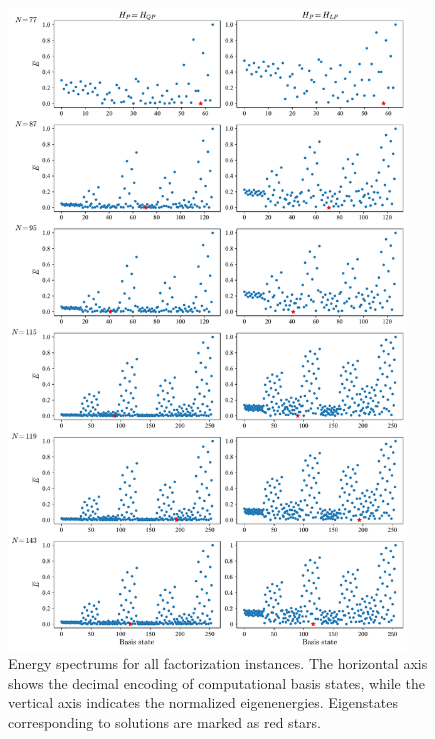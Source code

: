 \begin{figure}[H]
    \centering
    \includegraphics[width=0.94\textwidth]{06-appendix/figs/energy_spectrums_all2.pdf}
    \caption{Energy spectrums for all factorization instances. The horizontal axis shows the decimal encoding of computational basis states, while the vertical axis indicates the normalized eigenenergies. Eigenstates corresponding to solutions are marked as red stars.}
    \label{fig:energy_spectrums_all}
\end{figure}